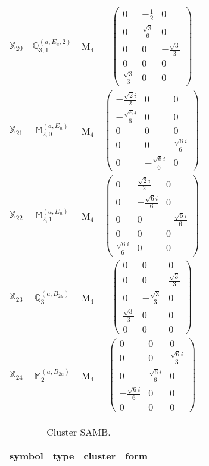 \documentclass[fleqn,10pt,landscape]{article}
\begin{document}
\begin{itemize}
\begin{center}
\begin{longtable}{c|c|c|c}
$ \mathbb{X}_{20} $ & $\mathbb{Q}_{3,1}^{(a,E_{u},2)}$ & M$_{4}$ & $\begin{pmatrix} 0 & - \frac{1}{2} & 0 \\ 0 & \frac{\sqrt{3}}{6} & 0 \\ 0 & 0 & - \frac{\sqrt{3}}{3} \\ 0 & 0 & 0 \\ \frac{\sqrt{3}}{3} & 0 & 0 \end{pmatrix}$ \\
$ \mathbb{X}_{21} $ & $\mathbb{M}_{2,0}^{(a,E_{u})}$ & M$_{4}$ & $\begin{pmatrix} - \frac{\sqrt{2} i}{2} & 0 & 0 \\ - \frac{\sqrt{6} i}{6} & 0 & 0 \\ 0 & 0 & 0 \\ 0 & 0 & \frac{\sqrt{6} i}{6} \\ 0 & - \frac{\sqrt{6} i}{6} & 0 \end{pmatrix}$ \\
$ \mathbb{X}_{22} $ & $\mathbb{M}_{2,1}^{(a,E_{u})}$ & M$_{4}$ & $\begin{pmatrix} 0 & \frac{\sqrt{2} i}{2} & 0 \\ 0 & - \frac{\sqrt{6} i}{6} & 0 \\ 0 & 0 & - \frac{\sqrt{6} i}{6} \\ 0 & 0 & 0 \\ \frac{\sqrt{6} i}{6} & 0 & 0 \end{pmatrix}$ \\
$ \mathbb{X}_{23} $ & $\mathbb{Q}_{3}^{(a,B_{2u})}$ & M$_{4}$ & $\begin{pmatrix} 0 & 0 & 0 \\ 0 & 0 & \frac{\sqrt{3}}{3} \\ 0 & - \frac{\sqrt{3}}{3} & 0 \\ \frac{\sqrt{3}}{3} & 0 & 0 \\ 0 & 0 & 0 \end{pmatrix}$ \\
$ \mathbb{X}_{24} $ & $\mathbb{M}_{2}^{(a,B_{2u})}$ & M$_{4}$ & $\begin{pmatrix} 0 & 0 & 0 \\ 0 & 0 & \frac{\sqrt{6} i}{3} \\ 0 & \frac{\sqrt{6} i}{6} & 0 \\ - \frac{\sqrt{6} i}{6} & 0 & 0 \\ 0 & 0 & 0 \end{pmatrix}$ \\
\end{longtable}
\end{center}
\begin{center}
\renewcommand{\arraystretch}{1.3}
\begin{longtable}{c|c|c|c}
\caption{Cluster SAMB.}
 \\
 \hline \hline
symbol & type & cluster & form \\ \hline \endfirsthead


\end{longtable}
\end{center}
\end{itemize}
\end{document}
